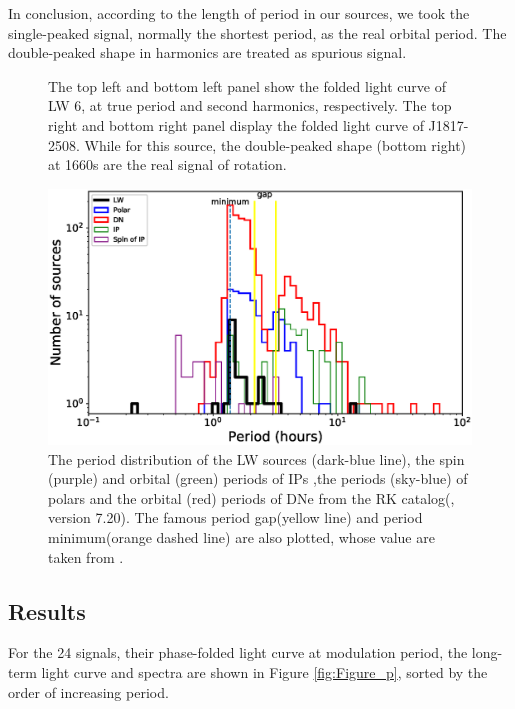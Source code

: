 \documentclass[twoside,twocolumn]{aastex63}
\begin{document}
 In conclusion, according to the length of period in our sources, we took the single-peaked signal, normally the shortest period, as the real orbital period. The double-peaked shape in harmonics are treated as spurious signal. 


\begin{figure}[htbp]
\caption{The top left and bottom left panel show the folded light curve of LW 6, at true period and second harmonics, respectively. The top right and bottom right panel display the folded light curve of J1817-2508. While for this source, the double-peaked shape (bottom right) at 1660s are the real signal of rotation. \label{fig:6thfig}}
\end{figure}

\begin{figure}[htbp]
\centering
\includegraphics[scale=0.73]{./figure/CV/N_P.eps}
\caption{The period distribution of the LW sources (dark-blue line), the spin (purple) and orbital (green) periods of IPs ,the periods (sky-blue) of polars and the orbital (red) periods of DNe from the RK catalog(\cite{2003A&A...404..301R}, version 7.20). The famous period gap(yellow line) and period minimum(orange dashed line) are also plotted, whose value are taken from \citep{2011ApJS..194...28K}.\label{fig:N_P}}
\end{figure}

\subsection{Results}
For the 24 signals, their phase-folded light curve at modulation period, the long-term light curve and spectra are shown in Figure \ref{fig:Figure_p}, sorted by the order of increasing period. 
\end{document}
